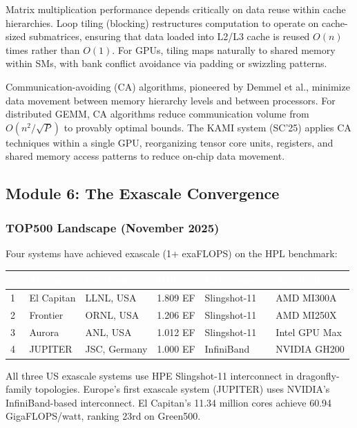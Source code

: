 \documentclass[11pt,letterpaper]{article}
\newcommand{\tableheader}[1]{\textbf{\sffamily\textcolor{white}{#1}}}
\begin{document}
Matrix multiplication performance depends critically on data reuse within cache hierarchies. Loop tiling (blocking) restructures computation to operate on cache-sized submatrices, ensuring that data loaded into L2/L3 cache is reused $O(n)$ times rather than $O(1)$. For GPUs, tiling maps naturally to shared memory within SMs, with bank conflict avoidance via padding or swizzling patterns.

Communication-avoiding (CA) algorithms, pioneered by Demmel et al., minimize data movement between memory hierarchy levels and between processors. For distributed GEMM, CA algorithms reduce communication volume from $O(n^2/\sqrt{P})$ to provably optimal bounds. The KAMI system (SC'25) applies CA techniques within a single GPU, reorganizing tensor core units, registers, and shared memory access patterns to reduce on-chip data movement.

\subsection{Module 6: The Exascale Convergence}

\subsubsection{TOP500 Landscape (November 2025)}

Four systems have achieved exascale (1+ exaFLOPS) on the HPL benchmark:

\begin{center}
\begin{tabularx}{\textwidth}{C{0.5cm}L{2.5cm}L{2.5cm}C{1.5cm}L{2cm}X}
\toprule
{}
\tableheader{\#} & \tableheader{System} & \tableheader{Location} & \tableheader{HPL} & \tableheader{Interconnect} & \tableheader{Accelerator} \\
 & El Capitan & LLNL, USA & 1.809 EF & Slingshot-11 & AMD MI300A \\
2 & Frontier & ORNL, USA & 1.206 EF & Slingshot-11 & AMD MI250X \\
3 & Aurora & ANL, USA & 1.012 EF & Slingshot-11 & Intel GPU Max \\
4 & JUPITER & JSC, Germany & 1.000 EF & InfiniBand & NVIDIA GH200 \\
\bottomrule
\end{tabularx}
\end{center}

All three US exascale systems use HPE Slingshot-11 interconnect in dragonfly-family topologies. Europe's first exascale system (JUPITER) uses NVIDIA's InfiniBand-based interconnect. El Capitan's 11.34 million cores achieve 60.94 GigaFLOPS/watt, ranking 23rd on Green500.
\end{document}
